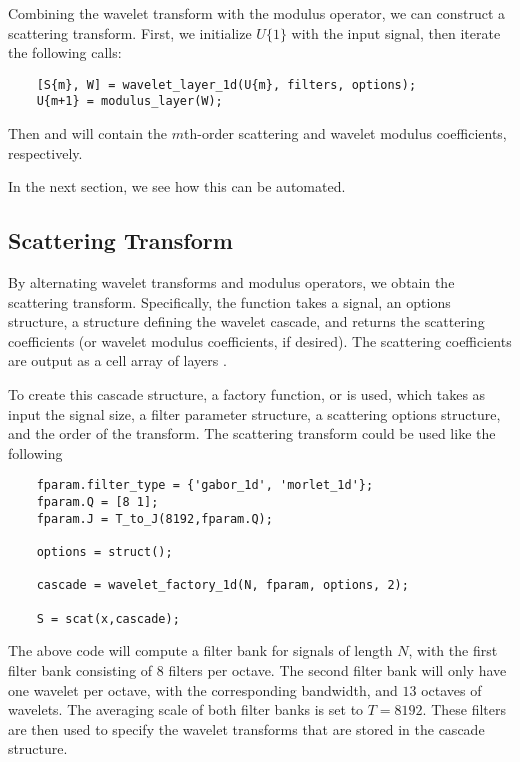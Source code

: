 \documentclass[twocolumn]{article}
\begin{document}
Combining the wavelet transform with the modulus operator, we can construct a scattering transform. First, we initialize $U\{1\}$ with the input signal, then 
iterate the following calls:
\begin{lstlisting}
	[S{m}, W] = wavelet_layer_1d(U{m}, filters, options);
	U{m+1} = modulus_layer(W);
\end{lstlisting}
Then  and  will contain the $m$th-order scattering and wavelet modulus coefficients, respectively.

In the next section, we see how this can be automated.

\subsection{Scattering Transform}

By alternating wavelet transforms and modulus operators, we obtain the scattering transform. Specifically, the  function takes a signal, an options 
structure, a structure defining the wavelet cascade, and returns the scattering coefficients (or wavelet modulus coefficients, if desired). The scattering 
coefficients are output as a cell array of layers .

To create this cascade structure, a factory function,  or  is used, which takes as input the signal size, a
 filter parameter structure, a scattering options structure, and the order of the transform. The scattering transform could be used like the following

\begin{lstlisting}
	fparam.filter_type = {'gabor_1d', 'morlet_1d'};
	fparam.Q = [8 1];
	fparam.J = T_to_J(8192,fparam.Q);
	
	options = struct();
	
	cascade = wavelet_factory_1d(N, fparam, options, 2);
	
	S = scat(x,cascade);
\end{lstlisting}

The above code will compute a filter bank for signals of length $N$, with the first filter bank consisting of $8$ filters per octave. The second filter bank 
will only have one wavelet per octave, with the corresponding bandwidth, and $13$ octaves of wavelets. The averaging scale of both filter banks is set to $T = 8192$.
These filters are then used to specify the wavelet transforms that are stored in the cascade structure.
\end{document}
